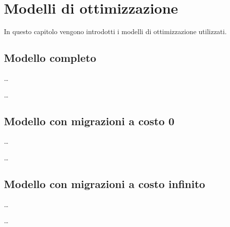 \chapter{Modelli di ottimizzazione}
\label{cap:modelli-ottimizzazione}

In questo capitolo vengono introdotti i modelli di ottimizzazione utilizzati.


%
%
\section{Modello completo}
\label{sec:modello-completo}

\dots



\dots


%
%
\section{Modello con migrazioni a costo 0}
\label{sec:modello-migrazioni-0}

\dots



\dots


%
%
\section{Modello con migrazioni a costo infinito}
\label{sec:modello-migrazioni-inf}

\dots



\dots
